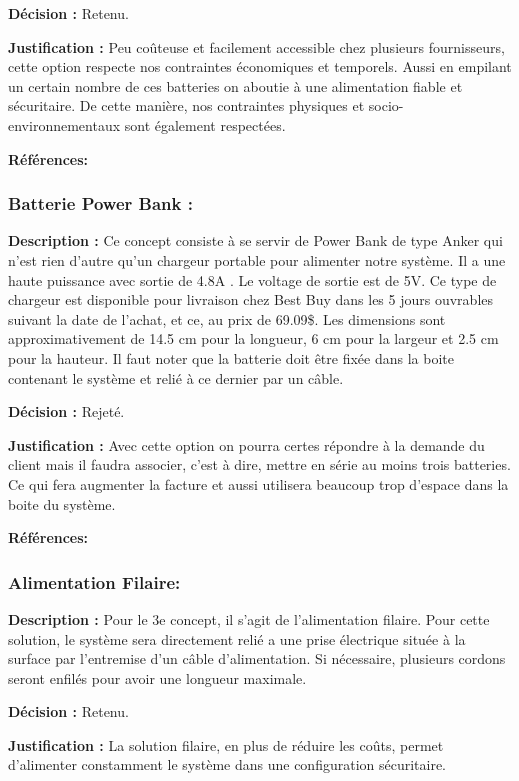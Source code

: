  \textbf{Décision :}
 Retenu.
 
 \textbf{Justification :}
 Peu coûteuse et facilement accessible chez plusieurs fournisseurs, cette option respecte nos contraintes économiques et temporels. Aussi en empilant un certain nombre de ces batteries on aboutie à une alimentation fiable et sécuritaire. De cette manière, nos contraintes physiques et socio-environnementaux sont également respectées.
 
\textbf{Références:} \cite{Lithium}

\subsubsection{Batterie Power Bank :}
\textbf{Description :}
 Ce concept consiste à se servir de Power Bank de type Anker qui n'est rien d'autre qu'un chargeur portable pour alimenter notre système. Il a une haute puissance avec sortie de 4.8A . Le voltage de sortie est de 5V. Ce type de chargeur est disponible pour livraison chez Best Buy dans les 5 jours ouvrables suivant la date de l'achat, et ce, au prix de 69.09\$. Les dimensions sont approximativement de 14.5 cm pour la longueur, 6 cm pour la largeur et 2.5 cm pour la hauteur. Il faut noter que la batterie doit être fixée dans la boite contenant le système et relié à ce dernier par un câble.
 
\textbf{Décision :}
 Rejeté.
 
\textbf{Justification :}
Avec cette option on pourra certes répondre à la demande du client mais il faudra associer, c'est à dire, mettre en série au moins trois batteries. Ce qui fera augmenter la facture et aussi utilisera beaucoup trop d'espace  dans la boite du système.
 
\textbf{Références:} \cite{Power_Bank}
 
\subsubsection{Alimentation Filaire:}
\textbf{Description :}
Pour le 3e concept, il s'agit de l'alimentation filaire. Pour cette solution, le système sera directement relié a une prise électrique située à la surface par l'entremise d'un câble d'alimentation. Si nécessaire, plusieurs cordons seront enfilés pour avoir une longueur maximale.
 
 \textbf{Décision :}
 Retenu.
 
 \textbf{Justification :}
 La solution filaire, en plus de réduire les coûts, permet d'alimenter constamment le système dans une configuration sécuritaire.
 
